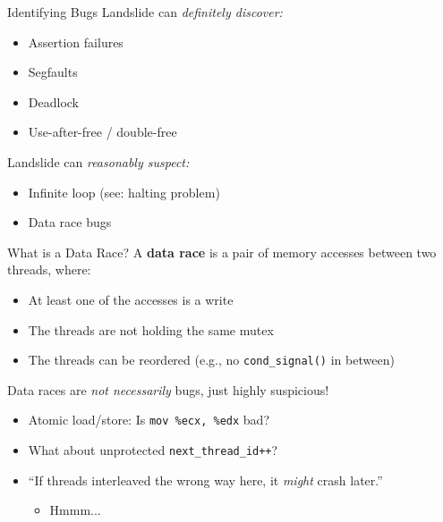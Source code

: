 \documentclass[xcolor=dvipsnames]{beamer}
\begin{document}
\begin{frame}{Identifying Bugs}
	Landslide can {\em definitely discover:}
	\begin{itemize}
		\item Assertion failures %
		\item Segfaults
		\item Deadlock
		\item Use-after-free / double-free
	\end{itemize}
	\linegap
	Landslide can {\em reasonably suspect:}
	\begin{itemize}
		\item Infinite loop (see: halting problem)
		\item Data race bugs
	\end{itemize}
\end{frame}

\begin{frame}{What is a Data Race?}
	A {\bf data race} is a pair of memory accesses between two threads, where:
	\begin{itemize}
		\item At least one of the accesses is a write
		\item The threads are not holding the same mutex
		\item The threads can be reordered (e.g., no \texttt{cond\_signal()} in between)
	\end{itemize}
	\pause
	\linegap

	Data races are {\em not necessarily} bugs, just highly suspicious!
	\begin{itemize}
		\item Atomic load/store: Is {\tt mov \%ecx, \%edx} bad?
		\item What about unprotected {\tt next\_thread\_id++}?
		\item ``If threads interleaved the wrong way here, it {\em might} crash later.''
		\begin{itemize}
			\item Hmmm...
		\end{itemize}
	\end{itemize}
\end{frame}

\end{document}
